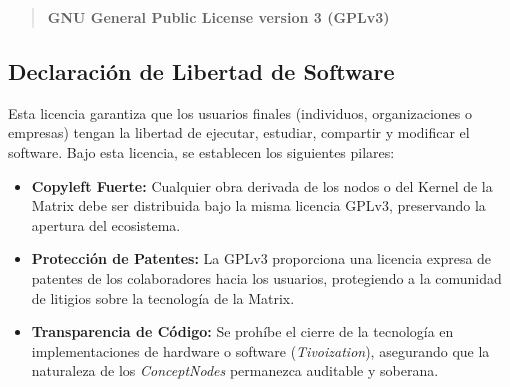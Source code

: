 \documentclass[12pt]{article}
\begin{document}
\begin{quote}
	\textbf{GNU General Public License version 3 (GPLv3)}
\end{quote}

\subsection{Declaración de Libertad de Software}
Esta licencia garantiza que los usuarios finales (individuos, organizaciones o empresas) tengan la libertad de ejecutar, estudiar, compartir y modificar el software. Bajo esta licencia, se establecen los siguientes pilares:

\begin{itemize}
	\item \textbf{Copyleft Fuerte:} Cualquier obra derivada de los nodos o del Kernel de la Matrix debe ser distribuida bajo la misma licencia GPLv3, preservando la apertura del ecosistema.
	\item \textbf{Protección de Patentes:} La GPLv3 proporciona una licencia expresa de patentes de los colaboradores hacia los usuarios, protegiendo a la comunidad de litigios sobre la tecnología de la Matrix.
	\item \textbf{Transparencia de Código:} Se prohíbe el cierre de la tecnología en implementaciones de hardware o software (\textit{Tivoization}), asegurando que la naturaleza de los \textit{ConceptNodes} permanezca auditable y soberana.
\end{itemize}
\end{document}
